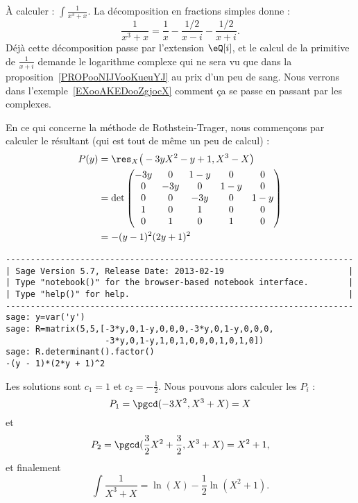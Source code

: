 \begin{example}     \label{EXooIPEQooGKDjea}
    À calculer : \( \int\frac{1}{ x^3+x }\). La décomposition en fractions simples donne :
    \begin{equation}
        \frac{1}{ x^3+x }= \frac{1}{ x }-\frac{ 1/2 }{ x-i }-\frac{ 1/2 }{ x+i }.
    \end{equation}
    Déjà cette décomposition passe par l'extension \( \eQ[i]\), et le calcul de la primitive de \( \frac{1}{ x+i }\) demande le logarithme complexe qui ne sera vu que dans la proposition~\ref{PROPooNIJVooKueuYJ} au prix d'un peu de sang.
    Nous verrons dans l'exemple~\ref{EXooAKEDooZgjocX} comment ça se passe en passant par les complexes.

    En ce qui concerne la méthode de Rothstein-Trager, nous commençons par calculer le résultant (qui est tout de même un peu de calcul) :
    \begin{subequations}
        \begin{align}
        P(y)&=\res_X\big( -3yX^2-y+1,X^3-X \big)\\
        &=\det\begin{pmatrix}
            -3y    &   0    &   1-y    &   0    &   0\\
            0    &   -3y    &   0    &   1-y    &   0\\
            0    &   0    &   -3y    &   0    &   1-y\\
            1    &   0    &   1    &   0    &   0\\
            0    &   1    &   0    &   1    &   0
        \end{pmatrix}\\
        &=-(y-1)^2(2y+1)^2
        \end{align}
    \end{subequations}

    \begin{verbatim}
----------------------------------------------------------------------
| Sage Version 5.7, Release Date: 2013-02-19                         |
| Type "notebook()" for the browser-based notebook interface.        |
| Type "help()" for help.                                            |
----------------------------------------------------------------------
sage: y=var('y')
sage: R=matrix(5,5,[-3*y,0,1-y,0,0,0,-3*y,0,1-y,0,0,0,
                    -3*y,0,1-y,1,0,1,0,0,0,1,0,1,0])
sage: R.determinant().factor()
-(y - 1)*(2*y + 1)^2
    \end{verbatim}
    Les solutions sont \( c_1=1\) et \( c_2=-\frac{ 1 }{2}\). Nous pouvons alors calculer les \( P_i\) :
    \begin{equation}
        P_1=\pgcd(-3X^2,X^3+X)=X
    \end{equation}
    et
    \begin{equation}
        P_2=\pgcd(\frac{ 3 }{2}X^2+\frac{ 3 }{2},X^3+X)=X^2+1,
    \end{equation}
    et finalement
    \begin{equation}
        \int\frac{ 1 }{ X^3+X }=\ln(X)-\frac{ 1 }{2}\ln(X^2+1).
    \end{equation}
\end{example}

